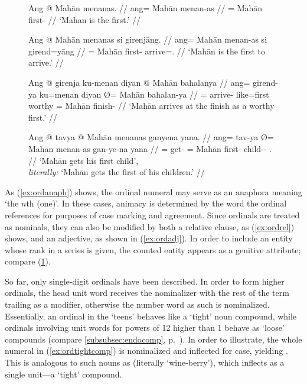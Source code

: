 \begin{figure}[h]
\pex\label{ex:ord}
\a\label{ex:ordanaph}\begingl
	\gla Ang @ Mahān menanas. //
	\glb ang= Mahān menan-as //
	\glc \Aarg{}= Mahān first-\Parg{} //
	\glft `Mahan is the first.' //
\endgl

\a\label{ex:ordrel}\begingl
	\gla Ang @ Mahān menanas si girenjāng. //
	\glb ang= Mahān menan-as si girend=yāng //
	\glc \Aarg{}= Mahān first-\Parg{} \Rel{} arrive=\TsgM{}.\Aarg{} //
	\glft `Mahān is the first to arrive.' //
\endgl

\a\label{ex:ordadj}\begingl
	\gla Ang @ girenja ku-menan diyan {} @ Mahān bahalanya //
	\glb ang= girend-ya ku=menan diyan Ø= Mahān bahalan-ya //
	\glc \Aarg{}= arrive-\TsgM{} like=first worthy \Top{}= Mahān 
		finish-\Loc{} //
	\glft `Mahān arrives at the finish as a worthy first.' //
\endgl

\a\label{ex:ordgen}\begingl
	\gla Ang @ tavya {} @ Mahān menanas ganyena yana. //
	\glb ang= tav-ya Ø= Mahān menan-as gan-ye-na yana //
	\glc \AgtT{}= get-\TsgM{} \Top{}= Mahān first-\Parg{} child-\Pl{}-\Gen{} 
		\TsgM{}.\Gen{} //
	\glft `Mahān gets his first child', \\
		\textit{literally:} `Mahān gets the first of his children.' //
\endgl
\xe
\end{figure}

As (\ref{ex:ordanaph}) shows, the ordinal numeral may serve as an anaphora
meaning `the $n$th (one)'. In these cases, animacy is determined by the word
the ordinal references for purposes of case marking and agreement. Since
ordinals are treated as nominals, they can also be modified by both a relative
clause, as (\ref{ex:ordrel}) shows, and an adjective, as shown in
(\ref{ex:ordadj}). In order to include an entity whose rank in a series is
given, the counted entity appears as a genitive attribute; compare
(\ref{ex:ordgen}).

So far, only single-digit ordinals have been described. In order to form higher
ordinals, the head unit word receives the nominalizer with the rest of the term
trailing as a modifier, otherwise the number word as such is nominalized.
Essentially, an ordinal in the `teens'
behaves like a `tight' noun compound, while ordinals involving unit words for
powers of 12 higher than 1 behave as `loose' compounds (compare
\autoref{subsubsec:endocomp}, p.~\pageref{loosecomp}). In order to illustrate,
the whole numeral  in (\ref{ex:ordtightcomp})
is nominalized and inflected for case, yielding
. This is analogous to such nouns as
 (literally `wine-berry'), which inflects
as a single unit---a `tight' compound.

